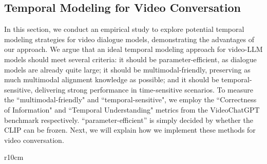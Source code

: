 \documentclass{article} \usepackage{iclr2024_conference,times}
\begin{document}
\subsection{Temporal Modeling for Video Conversation} \label{method_temp}
In this section, we conduct an empirical study to explore potential temporal modeling strategies for video dialogue models, demonstrating the advantages of our approach. We argue that an ideal temporal modeling approach for video-LLM models should meet several criteria: it should be parameter-efficient, as dialogue models are already quite large; it should be multimodal-friendly, preserving as much multimodal alignment knowledge as possible; and it should be temporal-sensitive, delivering strong performance in time-sensitive scenarios. To measure the ``multimodal-friendly" and ``temporal-sensitive", we employ the ``Correctness of Information" and ``Temporal Understanding" metrics from the VideoChatGPT benchmark \citep{maaz2023video} respectively. ``parameter-efficient'' is simply decided by whether the CLIP can be frozen. Next, we will explain how we implement these methods for video conversation.

\begin{wraptable}{r}{10cm}
\setlength{\tabcolsep}{3pt}
\begin{center}
    \vspace{-1em}
      \caption{\small The finetuning results of different temporal modeling on video conversation. * means CLIP is frozen.} 
      \vspace{-1em}
      \label{method_study}
      \renewcommand\tabcolsep{9pt}
    \end{center}
    \vspace{-1.5em}
\end{wraptable}
\end{document}
